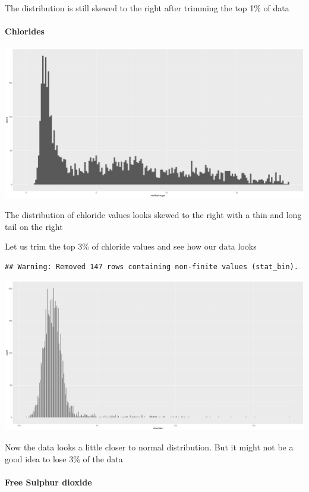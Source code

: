 \documentclass[]{article}
\let\oldparagraph\paragraph
\renewcommand{\paragraph}[1]{\oldparagraph{#1}\mbox{}}
\begin{document}
The distribution is still skewed to the right after trimming the top 1\%
of data

\paragraph{Chlorides}\label{chlorides}

\includegraphics{White_wine_quality_files/figure-latex/unnamed-chunk-12-1.pdf}

The distribution of chloride values looks skewed to the right with a
thin and long tail on the right

Let us trim the top 3\% of chloride values and see how our data looks

\begin{verbatim}
## Warning: Removed 147 rows containing non-finite values (stat_bin).
\end{verbatim}

\includegraphics{White_wine_quality_files/figure-latex/unnamed-chunk-13-1.pdf}

Now the data looks a little closer to normal distribution. But it might
not be a good idea to lose 3\% of the data

\paragraph{Free Sulphur dioxide}\label{free-sulphur-dioxide}
\end{document}
